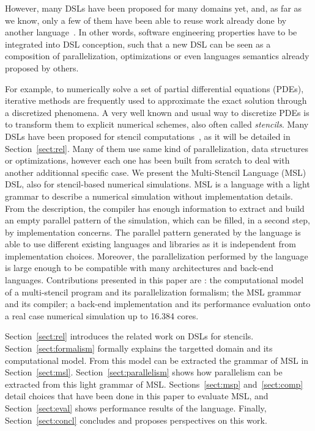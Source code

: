 However, many DSLs have been proposed for many domains yet, and, as far as we know, only a few of them have been able to reuse work already done by another language~\cite{Sujeeth:2013:CRC:2524984.2524988}. In other words, software engineering properties have to be integrated into DSL conception, such that a new DSL can be seen as a composition of parallelization, optimizations or even languages semantics already proposed by others.

For example, to numerically solve a set of partial differential equations (PDEs), iterative methods are frequently used to approximate the exact solution through a discretized phenomena. A very well known and usual way to discretize PDEs is to transform them to explicit numerical schemes, also often called \emph{stencils}. Many DSLs have been proposed for stencil computations~\cite{spaaTangCKLL11,citeulike12258902,Ragan-Kelley:2013:HLC:2491956.2462176,DeVito:2011:LDS:2063384.2063396,Camier:2015:IPP:2820083.2820107}, as it will be detailed in Section~\ref{sect:rel}. Many of them use same kind of parallelization, data structures or optimizations, however each one has been built from scratch to deal with another additionnal specific case.
We present the Multi-Stencil Language (MSL) DSL, also for stencil-based numerical simulations. MSL is a language with a light grammar to describe a numerical simulation without implementation details. From the description, the compiler has enough information to extract and build an empty parallel pattern of the simulation, which can be filled, in a second step, by implementation concerns. The parallel pattern generated by the language is able to use different existing languages and libraries as it is independent from implementation choices. Moreover, the parallelization performed by the language is large enough to be compatible with many architectures and back-end languages. Contributions presented in this paper are : the computational model of a multi-stencil program and its parallelization formalism; the MSL grammar and its compiler; a back-end implementation and its performance evaluation onto a real case numerical simulation up to 16.384 cores.

Section~\ref{sect:rel} introduces the related work on DSLs for stencils. Section~\ref{sect:formalism} formally explains the targetted domain and its computational model. From this model can be extracted the grammar of MSL in Section~\ref{sect:msl}. Section~\ref{sect:parallelism} shows how parallelism can be extracted from this light grammar of MSL. Sections~\ref{sect:msp} and~\ref{sect:comp} detail choices that have been done in this paper to evaluate MSL, and Section~\ref{sect:eval} shows performance results of the language. Finally, Section~\ref{sect:concl} concludes and proposes perspectives on this work.